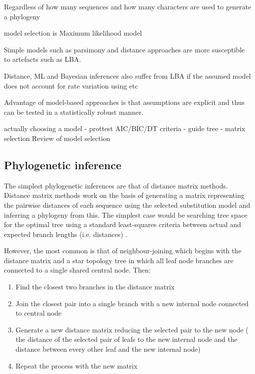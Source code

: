 Regardless of how many sequences and how many characters are used to generate a phylogeny 

model selection is 
Maximum likelihood model

Simple models such as parsimony and distance approaches are more susceptible to artefacts such as LBA.



Distance, ML and Bayesian inferences also suffer from LBA if the assumed model does not account for rate variation using \Gamma etc \citep{Yang1996}



Advantage of model-based approaches is that assumptions are explicit and thus can be tested in a statistically robust manner.








actually choosing a model - prottest AIC/BIC/DT criteria - guide tree - matrix selection \citep{Abascal2005}
Review of model selection \citep{Sullivan2005}



\subsection{Phylogenetic inference}


The simplest phylogenetic inferences are that of distance matrix methods.
Distance matrix methods \citep{Fitch1967} work on the basis of generating 
a matrix representing the pairwise distances of each sequence using the selected
substitution model and inferring a phylogeny from this.  The simplest case
would be searching tree space for the optimal tree using a standard least-squares
criteria between actual and expected branch lengths (i.e. distances) \citep{Fitch1967,Cavalli-Sforza1967}.

However, the most common is that of neighbour-joining which begins with the distance matrix and a 
star topology tree in which all leaf node branches are connected to a single shared central node.
Then:
\begin{enumerate}
    \item Find the closest two branches in the distance matrix 
    \item Join the closest pair into a single branch with a new internal node connected to central node
    \item Generate a new distance matrix reducing the selected pair to the new node (     
        the distance of the selected pair of leafs to the new internal node 
    and the distance between every other leaf and the new internal node)
    \item Repeat the process with the new matrix \citep{Nei1987}
\end{enumerate}

